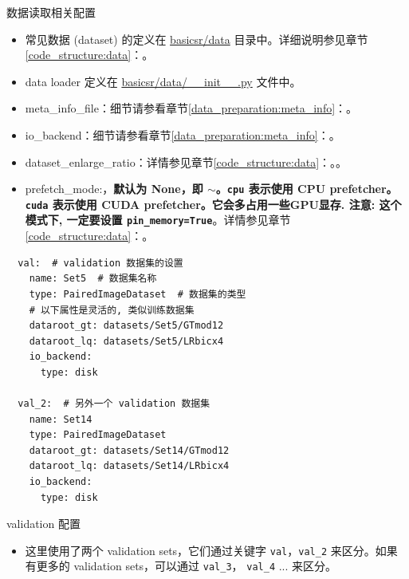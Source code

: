 \documentclass[../main.tex]{subfiles}
\begin{document}
\begin{exampleBox}[righthand ratio=0.00, sidebyside, sidebyside align=center, lower separated=false]{数据读取相关配置}
    \begin{itemize}
        \item 常见数据 (dataset) 的定义在 \href{https://github.com/XPixelGroup/BasicSR/blob/master/basicsr/data}{basicsr/data} 目录中。详细说明参见章节\ref{code_structure:data}：。
        \item data loader 定义在 \href{https://github.com/XPixelGroup/BasicSR/blob/master/basicsr/data/__init__.py}{basicsr/data/\_\_init\_\_.py} 文件中。
        \item meta\_info\_file：细节请参看章节\ref{data_preparation:meta_info}：。
        \item io\_backend：细节请参看章节\ref{data_preparation:meta_info}：。
        \item dataset\_enlarge\_ratio：详情参见章节\ref{code_structure:data}：。。
        \item prefetch\_mode:，\textbf{默认为 None，即 $\sim$。\texttt{cpu} 表示使用 CPU prefetcher。\texttt{cuda} 表示使用 CUDA prefetcher。它会多占用一些GPU显存. 注意: 这个模式下, 一定要设置 \texttt{pin\_memory=True}}。详情参见章节\ref{code_structure:data}：。
    \end{itemize}
\end{exampleBox}

\begin{verbatim}
  val:  # validation 数据集的设置
    name: Set5  # 数据集名称
    type: PairedImageDataset  # 数据集的类型
    # 以下属性是灵活的, 类似训练数据集
    dataroot_gt: datasets/Set5/GTmod12
    dataroot_lq: datasets/Set5/LRbicx4
    io_backend:
      type: disk

  val_2:  # 另外一个 validation 数据集
    name: Set14
    type: PairedImageDataset
    dataroot_gt: datasets/Set14/GTmod12
    dataroot_lq: datasets/Set14/LRbicx4
    io_backend:
      type: disk
\end{verbatim}

\begin{exampleBox}[righthand ratio=0.00, sidebyside, sidebyside align=center, lower separated=false]{validation 配置}
    \begin{itemize}
        \item 这里使用了两个 validation sets，它们通过关键字 \texttt{val}，\texttt{val\_2} 来区分。如果有更多的 validation sets，可以通过 \texttt{val\_3}， \texttt{val\_4} ... 来区分。
    \end{itemize}
\end{exampleBox}
\end{document}
